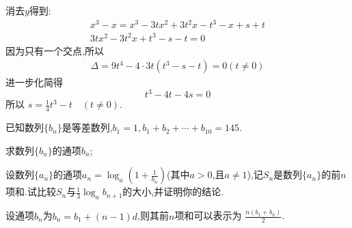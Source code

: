 \begin{questions}
\begin{penum}
\begin{solution}
\begin{penum}
				            消去$y$得到:
				            \begin{align*}
					            x^3 - x = x^3 - 3tx^2 + 3t^2x - t^3 - x + s + t \\
					            3tx^2 - 3t^2x + t^3 - s - t = 0
				            \end{align*}
				            因为只有一个交点,所以
				            \begin{align*}
					            \Delta = 9t^4 - 4\cdot 3t(t^3 - s - t) = 0 (t\neq0)
				            \end{align*}
				            进一步化简得
				            \begin{equation*}
					            t^3 - 4t - 4s = 0
				            \end{equation*}
				            所以
				            $s=\frac14t^3 - t\quad (t\neq0)$.
			      \end{penum}
		      \end{solution}
	\end{penum}
	\question 已知数列$\{b_n\}$是等差数列,$b_1=1, b_1+b_2+\cdots+b_{10}=145$.
	\begin{penum}
		\item 求数列$\{b_n\}$的通项$b_n$;
		\item 设数列$\{a_n\}$的通项$a_n = \log_a \left( 1 + \frac{1}{b_n}
			      \right)$(其中$a>0$,且$a\neq1$),记$S_n$是数列$\{a_n\}$的前$n$项和.试比较$S_n$与$\frac13\log_ab_{n+1}$的大小,并证明你的结论.
	\end{penum}

	\begin{solution}
		\begin{penum}
			\item 设通项$b_n$为$b_n = b_1 + (n-1)d$,则其前$n$项和可以表示为
			      \begin{math}
				      \frac{n(b_1 + b_n)}{2}
			      \end{math}.


\end{penum}
\end{solution}
\end{questions}
